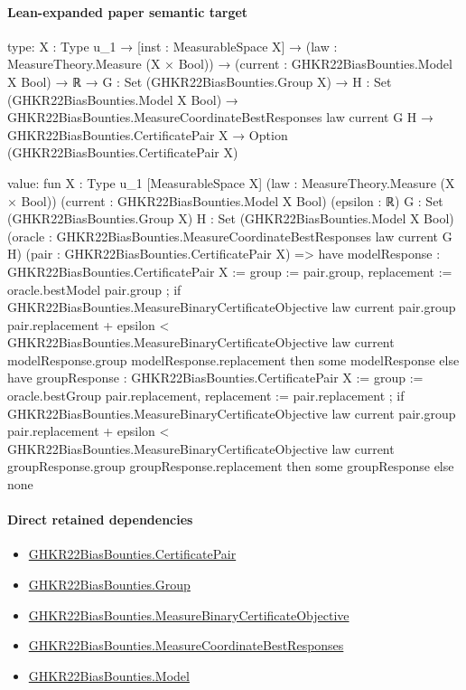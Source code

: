\documentclass[10pt]{article}
\begin{document}
\paragraph{Lean-expanded paper semantic target}
\begin{ReviewVerbatim}
type:
{X : Type u_1} →
  [inst : MeasurableSpace X] →
    (law : MeasureTheory.Measure (X × Bool)) →
      (current : GHKR22BiasBounties.Model X Bool) →
        ℝ →
          {G : Set (GHKR22BiasBounties.Group X)} →
            {H : Set (GHKR22BiasBounties.Model X Bool)} →
              GHKR22BiasBounties.MeasureCoordinateBestResponses law current G H →
                GHKR22BiasBounties.CertificatePair X → Option (GHKR22BiasBounties.CertificatePair X)

value:
fun {X : Type u_1} [MeasurableSpace X] (law : MeasureTheory.Measure (X × Bool))
    (current : GHKR22BiasBounties.Model X Bool) (epsilon : ℝ) {G : Set (GHKR22BiasBounties.Group X)}
    {H : Set (GHKR22BiasBounties.Model X Bool)}
    (oracle : GHKR22BiasBounties.MeasureCoordinateBestResponses law current G H)
    (pair : GHKR22BiasBounties.CertificatePair X) =>
  have modelResponse : GHKR22BiasBounties.CertificatePair X :=
    { group := pair.group, replacement := oracle.bestModel pair.group };
  if
      GHKR22BiasBounties.MeasureBinaryCertificateObjective law current pair.group pair.replacement + epsilon <
        GHKR22BiasBounties.MeasureBinaryCertificateObjective law current modelResponse.group
          modelResponse.replacement then
    some modelResponse
  else
    have groupResponse : GHKR22BiasBounties.CertificatePair X :=
      { group := oracle.bestGroup pair.replacement, replacement := pair.replacement };
    if
        GHKR22BiasBounties.MeasureBinaryCertificateObjective law current pair.group pair.replacement + epsilon <
          GHKR22BiasBounties.MeasureBinaryCertificateObjective law current groupResponse.group
            groupResponse.replacement then
      some groupResponse
    else none
\end{ReviewVerbatim}

\paragraph{Direct retained dependencies}
\begin{itemize}\raggedright
\item \hyperlink{governing-declaration-b396fb14c5f379fe}{GHKR22\allowbreak{}Bias\allowbreak{}Bounties.\allowbreak{}Certificate\allowbreak{}Pair}
\item \hyperlink{paper-prerequisite-cc7214115b27106f}{GHKR22\allowbreak{}Bias\allowbreak{}Bounties.\allowbreak{}Group}
\item \hyperlink{governing-declaration-d01ac455a50eb103}{GHKR22\allowbreak{}Bias\allowbreak{}Bounties.\allowbreak{}Measure\allowbreak{}Binary\allowbreak{}Certificate\allowbreak{}Objective}
\item \hyperlink{governing-declaration-84d84e83239c6aed}{GHKR22\allowbreak{}Bias\allowbreak{}Bounties.\allowbreak{}Measure\allowbreak{}Coordinate\allowbreak{}Best\allowbreak{}Responses}
\item \hyperlink{paper-prerequisite-333127605c12eba8}{GHKR22\allowbreak{}Bias\allowbreak{}Bounties.\allowbreak{}Model}
\end{itemize}
\end{document}
